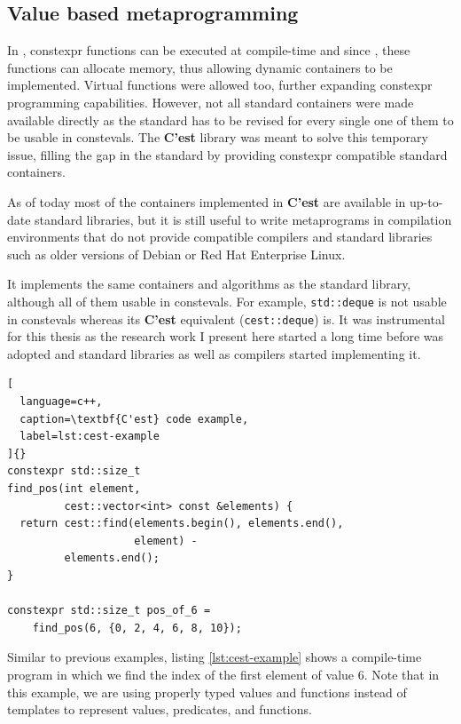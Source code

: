 \documentclass[../main]{subfiles}
\begin{document}
\subsection{
  Value based metaprogramming
}

In \cpp, \gls{constexpr} functions can be executed at compile-time and since
, these functions can allocate memory, thus allowing dynamic containers
to be implemented. Virtual functions were allowed too, further expanding
\gls{constexpr} programming capabilities.
However, not all standard containers were made available directly as
the standard has to be revised for every single one of them to be
usable in \glspl{consteval}. The \textbf{C'est} \cite{cest} library was meant to solve
this temporary issue, filling the gap in the \cpp standard by providing
\gls{constexpr} compatible standard containers.

As of today most of the containers implemented in \textbf{C'est} are available in
up-to-date standard libraries, but it is still useful to write metaprograms
in compilation environments that do not provide  compatible compilers
and standard libraries such as older versions of Debian
or Red Hat Enterprise Linux.

It implements the same containers and algorithms as the \cpp standard library,
although all of them usable in \glspl{consteval}. For example,
\lstinline{std::deque} is not usable in \glspl{consteval} whereas
its \textbf{C'est} equivalent (\lstinline{cest::deque}) is.
It was instrumental for this thesis as the research work I present here started
a long time before  was adopted and standard libraries as well as
compilers started implementing it.

\begin{lstlisting}[
  language=c++,
  caption=\textbf{C'est} code example,
  label=lst:cest-example
]{}
constexpr std::size_t
find_pos(int element,
         cest::vector<int> const &elements) {
  return cest::find(elements.begin(), elements.end(),
                    element) -
         elements.end();
}

constexpr std::size_t pos_of_6 =
    find_pos(6, {0, 2, 4, 6, 8, 10});
\end{lstlisting}

Similar to previous examples, listing \ref{lst:cest-example} shows a
compile-time program in which we find the index of the first element of value 6.
Note that in this example, we are using properly typed values and functions
instead of templates to represent values, predicates, and functions.
\end{document}

